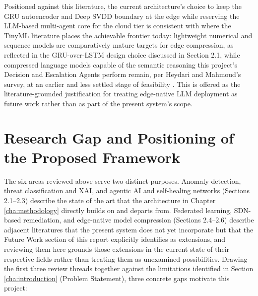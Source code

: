 Positioned against this literature, the current architecture's choice to keep the GRU autoencoder and Deep SVDD boundary at the edge while reserving the LLM-based multi-agent core for the cloud tier is consistent with where the TinyML literature places the achievable frontier today: lightweight numerical and sequence models are comparatively mature targets for edge compression, as reflected in the GRU-over-LSTM design choice discussed in Section 2.1, while compressed language models capable of the semantic reasoning this project's Decision and Escalation Agents perform remain, per Heydari and Mahmoud's survey, at an earlier and less settled stage of feasibility \cite{Heydari2025}. This is offered as the literature-grounded justification for treating edge-native LLM deployment as future work rather than as part of the present system's scope.

\section{Research Gap and Positioning of the Proposed Framework}

The six areas reviewed above serve two distinct purposes. Anomaly detection, threat classification and XAI, and agentic AI and self-healing networks (Sections 2.1--2.3) describe the state of the art that the architecture in Chapter \ref{cha:methodology} directly builds on and departs from. Federated learning, SDN-based remediation, and edge-native model compression (Sections 2.4--2.6) describe adjacent literatures that the present system does not yet incorporate but that the Future Work section of this report explicitly identifies as extensions, and reviewing them here grounds those extensions in the current state of their respective fields rather than treating them as unexamined possibilities. Drawing the first three review threads together against the limitations identified in Section \ref{cha:introduction} (Problem Statement), three concrete gaps motivate this project:

